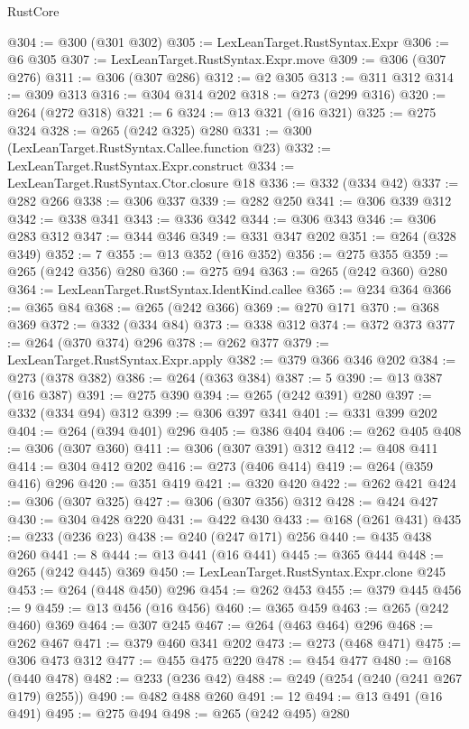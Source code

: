 \begin{lexlean}{RustCore}
\begin{coremodule}
{\begin{coremodule}
{{{{{{{{{@304 := @300 (@301 @302)
@305 := LexLeanTarget.RustSyntax.Expr
@306 := @6 @305
@307 := LexLeanTarget.RustSyntax.Expr.move
@309 := @306 (@307 @276)
@311 := @306 (@307 @286)
@312 := @2 @305
@313 := @311 @312
@314 := @309 @313
@316 := @304 @314 @202
@318 := @273 (@299 @316)
@320 := @264 (@272 @318)
@321 := 6
@324 := @13 @321 (@16 @321)
@325 := @275 @324
@328 := @265 (@242 @325) @280
@331 := @300 (LexLeanTarget.RustSyntax.Callee.function @23)
@332 := LexLeanTarget.RustSyntax.Expr.construct
@334 := LexLeanTarget.RustSyntax.Ctor.closure @18
@336 := @332 (@334 @42)
@337 := @282 @266
@338 := @306 @337
@339 := @282 @250
@341 := @306 @339 @312
@342 := @338 @341
@343 := @336 @342
@344 := @306 @343
@346 := @306 @283 @312
@347 := @344 @346
@349 := @331 @347 @202
@351 := @264 (@328 @349)
@352 := 7
@355 := @13 @352 (@16 @352)
@356 := @275 @355
@359 := @265 (@242 @356) @280
@360 := @275 @94
@363 := @265 (@242 @360) @280
@364 := LexLeanTarget.RustSyntax.IdentKind.callee
@365 := @234 @364
@366 := @365 @84
@368 := @265 (@242 @366)
@369 := @270 @171
@370 := @368 @369
@372 := @332 (@334 @84)
@373 := @338 @312
@374 := @372 @373
@377 := @264 (@370 @374) @296
@378 := @262 @377
@379 := LexLeanTarget.RustSyntax.Expr.apply
@382 := @379 @366 @346 @202
@384 := @273 (@378 @382)
@386 := @264 (@363 @384)
@387 := 5
@390 := @13 @387 (@16 @387)
@391 := @275 @390
@394 := @265 (@242 @391) @280
@397 := @332 (@334 @94) @312
@399 := @306 @397 @341
@401 := @331 @399 @202
@404 := @264 (@394 @401) @296
@405 := @386 @404
@406 := @262 @405
@408 := @306 (@307 @360)
@411 := @306 (@307 @391) @312
@412 := @408 @411
@414 := @304 @412 @202
@416 := @273 (@406 @414)
@419 := @264 (@359 @416) @296
@420 := @351 @419
@421 := @320 @420
@422 := @262 @421
@424 := @306 (@307 @325)
@427 := @306 (@307 @356) @312
@428 := @424 @427
@430 := @304 @428 @220
@431 := @422 @430
@433 := @168 (@261 @431)
@435 := @233 (@236 @23)
@438 := @240 (@247 @171) @256
@440 := @435 @438 @260
@441 := 8
@444 := @13 @441 (@16 @441)
@445 := @365 @444
@448 := @265 (@242 @445) @369
@450 := LexLeanTarget.RustSyntax.Expr.clone @245
@453 := @264 (@448 @450) @296
@454 := @262 @453
@455 := @379 @445
@456 := 9
@459 := @13 @456 (@16 @456)
@460 := @365 @459
@463 := @265 (@242 @460) @369
@464 := @307 @245
@467 := @264 (@463 @464) @296
@468 := @262 @467
@471 := @379 @460 @341 @202
@473 := @273 (@468 @471)
@475 := @306 @473 @312
@477 := @455 @475 @220
@478 := @454 @477
@480 := @168 (@440 @478)
@482 := @233 (@236 @42)
@488 := @249 (@254 (@240 (@241 @267 @179) @255))
@490 := @482 @488 @260
@491 := 12
@494 := @13 @491 (@16 @491)
@495 := @275 @494
@498 := @265 (@242 @495) @280
}}}}}}}}}
\end{coremodule}}
\end{coremodule}
\end{lexlean}

